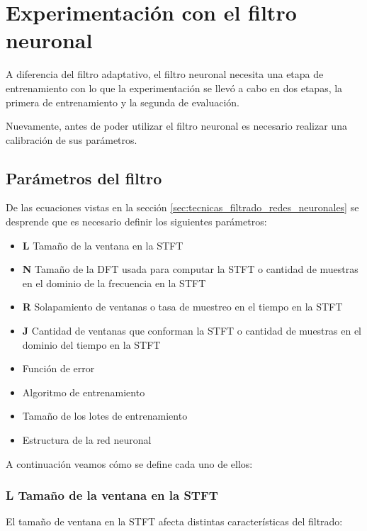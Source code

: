 \section{Experimentación con el filtro neuronal}

A diferencia del filtro adaptativo, el filtro neuronal necesita una etapa de entrenamiento con lo que la experimentación se llevó a cabo en dos etapas, la primera de entrenamiento y la segunda de evaluación. 

Nuevamente, antes de poder utilizar el filtro neuronal es necesario realizar una calibración de sus parámetros.

\subsection{Parámetros del filtro}

De las ecuaciones vistas en la sección \ref{sec:tecnicas_filtrado_redes_neuronales} se desprende que es necesario definir los siguientes parámetros:

\begin{itemize}
	\item \textbf{L} Tamaño de la ventana en la STFT
	\item \textbf{N} Tamaño de la DFT usada para computar la STFT o cantidad de muestras en el dominio de la frecuencia en la STFT 
	\item \textbf{R} Solapamiento de ventanas o tasa de muestreo en el tiempo en la STFT
	\item \textbf{J} Cantidad de ventanas que conforman la STFT o cantidad de muestras en el dominio del tiempo en la STFT 
	\item Función de error
	\item Algoritmo de entrenamiento
	\item Tamaño de los lotes de entrenamiento
	\item Estructura de la red neuronal
\end{itemize}

A continuación veamos cómo se define cada uno de ellos:

\subsubsection{L Tamaño de la ventana en la STFT}

El tamaño de ventana en la STFT afecta distintas características del filtrado:

